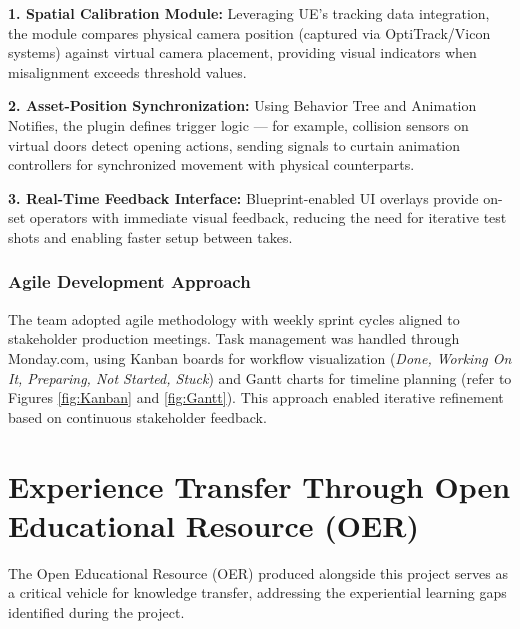 \documentclass[12pt,a4paper]{report}
\begin{document}
\textbf{1. Spatial Calibration Module:}
Leveraging UE's tracking data integration, the module compares physical camera position (captured via OptiTrack/Vicon systems) against virtual camera placement, providing visual indicators when misalignment exceeds threshold values.

\textbf{2. Asset-Position Synchronization:}
Using Behavior Tree and Animation Notifies, the plugin defines trigger logic — for example, collision sensors on virtual doors detect opening actions, sending signals to curtain animation controllers for synchronized movement with physical counterparts.

\textbf{3. Real-Time Feedback Interface:}
Blueprint-enabled UI overlays provide on-set operators with immediate visual feedback, reducing the need for iterative test shots and enabling faster setup between takes.

\subsubsection{Agile Development Approach}
The team adopted agile methodology with weekly sprint cycles aligned to stakeholder production meetings. Task management was handled through Monday.com, using Kanban boards for workflow visualization (\textit{Done, Working On It, Preparing, Not Started, Stuck}) and Gantt charts for timeline planning (refer to Figures \ref{fig:Kanban} and \ref{fig:Gantt}). This approach enabled iterative refinement based on continuous stakeholder feedback.


\section{Experience Transfer Through Open Educational Resource (OER)}

The Open Educational Resource (OER) produced alongside this project serves as a critical vehicle for knowledge transfer, addressing the experiential learning gaps identified during the project.
\end{document}
